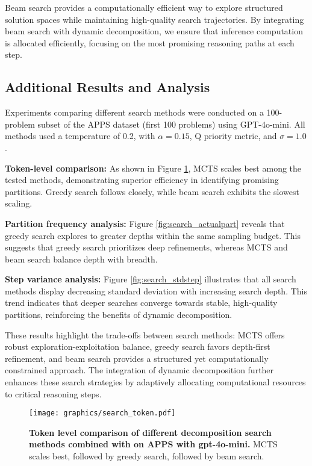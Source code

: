 Beam search provides a computationally efficient way to explore structured solution spaces while maintaining high-quality search trajectories. By integrating beam search with dynamic decomposition, we ensure that inference computation is allocated efficiently, focusing on the most promising reasoning paths at each step.














\subsection{Additional Results and Analysis}
Experiments comparing different search methods were conducted on a 100-problem subset of the APPS dataset (first 100 problems) using GPT-4o-mini. All methods used a temperature of 0.2, with $\alpha=0.15$, Q priority metric, and $\sigma=1.0$.

\textbf{Token-level comparison:} As shown in Figure \ref{fig:search_token}, MCTS scales best among the tested methods, demonstrating superior efficiency in identifying promising partitions. Greedy search follows closely, while beam search exhibits the slowest scaling.

\textbf{Partition frequency analysis:} Figure \ref{fig:search_actualpart} reveals that greedy search explores to greater depths within the same sampling budget. This suggests that greedy search prioritizes deep refinements, whereas MCTS and beam search balance depth with breadth.

\textbf{Step variance analysis:} Figure \ref{fig:search_stdstep} illustrates that all search methods display decreasing standard deviation with increasing search depth. This trend indicates that deeper searches converge towards stable, high-quality partitions, reinforcing the benefits of dynamic decomposition.

These results highlight the trade-offs between search methods: MCTS offers robust exploration-exploitation balance, greedy search favors depth-first refinement, and beam search provides a structured yet computationally constrained approach. The integration of dynamic decomposition further enhances these search strategies by adaptively allocating computational resources to critical reasoning steps.

\begin{figure}[ht]
    \centering
    \texttt{[image: graphics/search\_token.pdf]}
    \caption{\textbf{Token level comparison of different decomposition search methods combined with \decomp on APPS with gpt-4o-mini.} MCTS scales best, followed by greedy search, followed by beam search.}
    \label{fig:search_token}
\end{figure}

